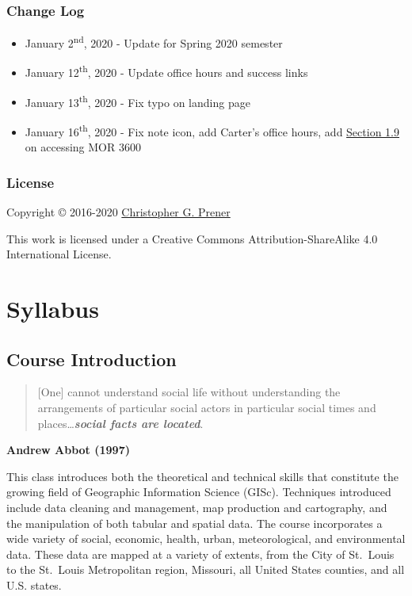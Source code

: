 \documentclass[]{book}
\providecommand{\tightlist}{%
  \setlength{\itemsep}{0pt}\setlength{\parskip}{0pt}}
\begin{document}
\hypertarget{change-log}{%
\section*{Change Log}\label{change-log}}

\begin{itemize}
\tightlist
\item
  January 2\textsuperscript{nd}, 2020 - Update for Spring 2020 semester
\item
  January 12\textsuperscript{th}, 2020 - Update office hours and success links
\item
  January 13\textsuperscript{th}, 2020 - Fix typo on landing page
\item
  January 16\textsuperscript{th}, 2020 - Fix note icon, add Carter's office hours, add \href{/syllabus/lab-access.html}{Section 1.9} on accessing MOR 3600
\end{itemize}

\hypertarget{license}{%
\section*{License}\label{license}}

Copyright © 2016-2020 \href{https://chris-prener.github.io}{Christopher G. Prener}

This work is licensed under a Creative Commons Attribution-ShareAlike 4.0 International License.

\hypertarget{part-syllabus}{%
\part{Syllabus}\label{part-syllabus}}

\hypertarget{course-introduction}{%
\chapter{Course Introduction}\label{course-introduction}}

\begin{quote}
{[}One{]} cannot understand social life without understanding the arrangements of particular social actors in particular social times and places\ldots{}\textbf{\emph{social facts are located}}.
\end{quote}

\textbf{Andrew Abbot (1997)}

This class introduces both the theoretical and technical skills that constitute the growing field of Geographic Information Science (GISc). Techniques introduced include data cleaning and management, map production and cartography, and the manipulation of both tabular and spatial data. The course incorporates a wide variety of social, economic, health, urban, meteorological, and environmental data. These data are mapped at a variety of extents, from the City of St.~Louis to the St.~Louis Metropolitan region, Missouri, all United States counties, and all U.S. states.
\end{document}
